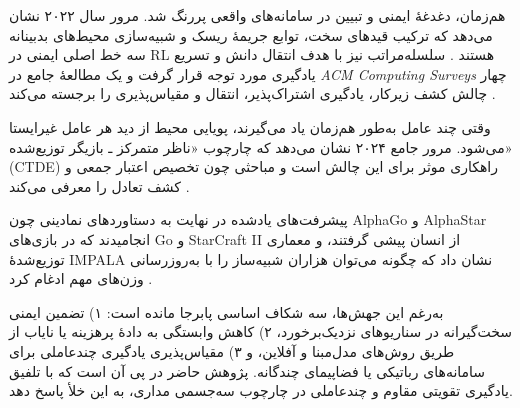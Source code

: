 \noindent
هم‌زمان، دغدغهٔ ایمنی و تبیین در سامانه‌های واقعی پررنگ شد. مرور سال ۲۰۲۲ نشان می‌دهد که ترکیب قیدهای سخت، توابع جریمهٔ ریسک و شبیه‌سازی محیط‌های بدبینانه سه خط اصلی ایمنی در RL هستند \cite{Garcia2022SafeSurvey}. سلسله‌مراتب نیز با هدف انتقال دانش و تسریع یادگیری مورد توجه قرار گرفت و یک مطالعهٔ جامع در {\it ACM Computing Surveys} چهار چالش کشف زیرکار، یادگیری اشتراک‌پذیر، انتقال و مقیاس‌پذیری را برجسته می‌کند \cite{Ghazalpour2021HRLsurvey}. %

\noindent
وقتی چند عامل به‌طور هم‌زمان یاد می‌گیرند، پویایی محیط از دید هر عامل غیرایستا می‌شود. مرور جامع ۲۰۲۴ نشان می‌دهد که چارچوب «ناظر متمرکز ـ بازیگر توزیع‌شده» (CTDE) راهکاری موثر برای این چالش است و مباحثی چون تخصیص اعتبار جمعی و کشف تعادل را معرفی می‌کند \cite{Song2024MARLsurvey}. %

\noindent
پیشرفت‌های یادشده در نهایت به دستاوردهای نمادینی چون AlphaGo \cite{Silver2016AlphaGo} و AlphaStar \cite{Vinyals2019AlphaStar} انجامیدند که در بازی‌های Go و StarCraft II از انسان پیشی گرفتند، و معماری توزیع‌شدهٔ IMPALA نشان داد که چگونه می‌توان هزاران شبیه‌ساز را با به‌روزرسانی وزن‌های مهم ادغام کرد \cite{Espeholt2018IMPALA}. %

\noindent
به‌رغم این جهش‌ها، سه شکاف اساسی پابرجا مانده است: ۱) تضمین ایمنی سخت‌گیرانه در سناریوهای نزدیک‌برخورد، ۲) کاهش وابستگی به دادهٔ پرهزینه یا نایاب از طریق روش‌های مدل‌مبنا و آفلاین، و ۳) مقیاس‌پذیری یادگیری چندعاملی برای سامانه‌های رباتیکی یا فضاپیمای چندگانه. پژوهش حاضر در پی آن است که با تلفیق یادگیری تقویتی مقاوم و چندعاملی در چارچوب سه‌جسمی مداری، به این خلأ پاسخ دهد.

